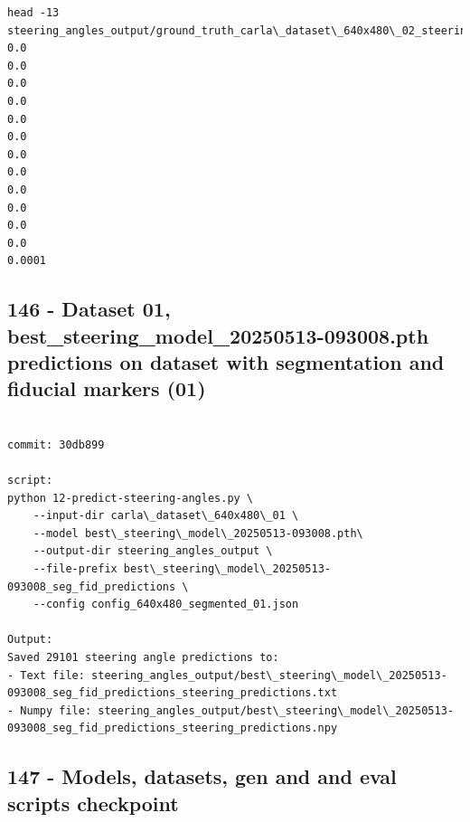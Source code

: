 \begin{verbatim}
head -13 steering_angles_output/ground_truth_carla\_dataset\_640x480\_02_steering_angles.txt
0.0
0.0
0.0
0.0
0.0
0.0
0.0
0.0
0.0
0.0
0.0
0.0
0.0001

\end{verbatim}

\subsection{146 - Dataset 01, best\_steering\_model\_20250513-093008.pth predictions on dataset with segmentation and fiducial markers (01)}
\label{app_res:146}

\begin{verbatim}

commit: 30db899

script:
python 12-predict-steering-angles.py \
    --input-dir carla\_dataset\_640x480\_01 \
    --model best\_steering\_model\_20250513-093008.pth\
    --output-dir steering_angles_output \
    --file-prefix best\_steering\_model\_20250513-093008_seg_fid_predictions \
    --config config_640x480_segmented_01.json

Output:
Saved 29101 steering angle predictions to:
- Text file: steering_angles_output/best\_steering\_model\_20250513-093008_seg_fid_predictions_steering_predictions.txt
- Numpy file: steering_angles_output/best\_steering\_model\_20250513-093008_seg_fid_predictions_steering_predictions.npy

\end{verbatim}

\subsection{147 - Models, datasets, gen and and eval scripts checkpoint}
\label{app_res:147}

